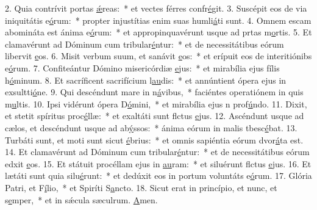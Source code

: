 2. Quia contrívit portas \uline{ǽ}reas:~* et vectes férres confr\uline{é}git.
3. Suscépit eos de via iniquitátis e\uline{ó}rum:~* propter injustítias enim suas humli\uline{á}ti sunt.
4. Omnem escam abomináta est ánima e\uline{ó}rum:~* et appropinquavérunt usque ad prtas m\uline{o}rtis.
5. Et clamavérunt ad Dóminum cum tribular\uline{é}ntur:~* et de necessitátibus eórum libervit \uline{e}os.
6. Misit verbum suum, et sanávit \uline{e}os:~* et erípuit eos de interitiónibs e\uline{ó}rum.
7. Confiteántur Dómino misericórdiæ \uline{e}jus:~* et mirabília ejus fílis h\uline{ó}minum.
8. Et sacríficent sacrifícium l\uline{au}dis:~* et annúntient ópera ejus in exsultti\uline{ó}ne.
9. Qui descéndunt mare in n\uline{á}vibus,~* faciéntes operatiónem in quis m\uline{u}ltis.
10. Ipsi vidérunt ópera D\uline{ó}mini,~* et mirabília ejus n prof\uline{ú}ndo.
11. Dixit, et stetit spíritus proc\uline{é}llæ:~* et exaltáti sunt flctus \uline{e}jus.
12. Ascéndunt usque ad cælos, et descéndunt usque ad ab\uline{ý}ssos:~* ánima eórum in malis tbesc\uline{é}bat.
13. Turbáti sunt, et moti sunt sicut \uline{é}brius:~* et omnis sapiéntia eórum dvor\uline{á}ta est.
14. Et clamavérunt ad Dóminum cum tribular\uline{é}ntur:~* et de necessitátibus eórum edxit \uline{e}os.
15. Et státuit procéllam ejus in \uline{au}ram:~* et siluérunt flctus \uline{e}jus.
16. Et lætáti sunt quia silu\uline{é}runt:~* et dedúxit eos in portum voluntáts e\uline{ó}rum.
17. Glória Patri, et F\uline{í}lio,~* et Spiríti S\uline{a}ncto.
18. Sicut erat in princípio, et nunc, et s\uline{e}mper,~* et in sǽcula sæculrum. \uline{A}men.
